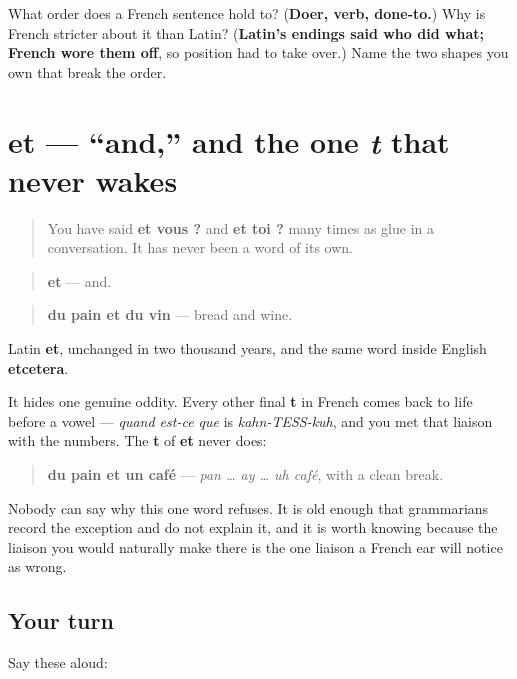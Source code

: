 \begin{tcolorbox}[breakable,colback=teal!4,colframe=teal!35!black,title={Before you move on}]
What order does a French sentence hold to? (\textbf{Doer, verb, done-to.}) Why is French stricter about it than Latin? (\textbf{Latin's endings said who did what; French wore them off}, so position had to take over.) Name the two shapes you own that break the order.
\end{tcolorbox}
\section[et]{et — \textquotedblleft{}and,\textquotedblright{} and the one \emph{t} that never wakes}

\label{lesson:FR-C36-et}



\begin{quote}
You have said \textbf{et vous ?} and \textbf{et toi ?} many times as glue in a conversation. It has never been a word of its own.
\end{quote}

\begin{cousinweb}
\begin{quote}
\textbf{et} — and.
\end{quote}

\begin{quote}
\textbf{du pain et du vin} — bread and wine.
\end{quote}

Latin \textbf{et}, unchanged in two thousand years, and the same word inside English \textbf{etcetera}.

It hides one genuine oddity. Every other final \textbf{t} in French comes back to life before a vowel — \emph{quand est-ce que} is \emph{kahn-TESS-kuh}, and you met that liaison with the numbers. The \textbf{t} of \textbf{et} never does:

\begin{quote}
\textbf{du pain et un café} — \emph{pan … ay … uh café}, with a clean break.
\end{quote}

Nobody can say why this one word refuses. It is old enough that grammarians record the exception and do not explain it, and it is worth knowing because the liaison you would naturally make there is the one liaison a French ear will notice as wrong.
\end{cousinweb}

\subsection*{Your turn}
Say these aloud:

